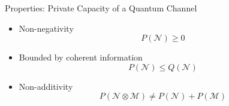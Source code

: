 \begin{frame}{Properties: Private Capacity of a Quantum Channel}
\begin{itemize}
    \setlength{\itemsep}{1.5em}
    \item Non-negativity
    $$P(\mathcal{N}) \geq 0$$
    \item Bounded by coherent information
    $$P(\mathcal{N}) \leq Q(\mathcal{N})$$
    \item Non-additivity
    $$P(\mathcal{N} \otimes \mathcal{M}) \neq P(\mathcal{N}) + P(\mathcal{M})$$
\end{itemize}
\end{frame}
